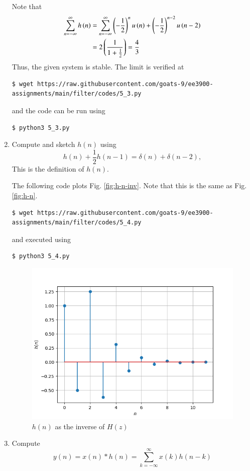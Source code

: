 \documentclass[journal,12pt,twocolumn]{IEEEtran}
\renewcommand\thesection{\arabic{section}}
\begin{document}
\begin{enumerate}[label=\thesection.\arabic*]
\solution
Note that
\begin{align}
	\sum_{n = -\infty}^{\infty}h\left(n\right) &= \sum_{n = -\infty}^{\infty}
	\left(-\frac{1}{2}\right)^nu\left(n\right) + \left(-\frac{1}{2}\right)^{n - 2}u\left(n - 2\right) \\
										 &= 2\left(\frac{1}{1 + \frac{1}{2}}\right) = \frac{4}{3}
\end{align}
Thus, the given system is stable. The limit is verified at
\begin{lstlisting}
$ wget https://raw.githubusercontent.com/goats-9/ee3900-assignments/main/filter/codes/5_3.py
\end{lstlisting}
and the code can be run using
\begin{lstlisting}
$ python3 5_3.py
\end{lstlisting}

\item 
Compute and sketch $h(n)$ using 
\begin{equation}
\label{eq:iir_filter_h}
h(n) + \frac{1}{2}h(n-1) = \delta(n) + \delta(n-2), 
\end{equation}
This is the definition of $h(n)$.

\solution The following code plots Fig. \eqref{fig:h-n-inv}. Note that this is
the same as Fig. \eqref{fig:h-n}.
\begin{lstlisting}
$ wget https://raw.githubusercontent.com/goats-9/ee3900-assignments/main/filter/codes/5_4.py
\end{lstlisting}
and executed using
\begin{lstlisting}
$ python3 5_4.py
\end{lstlisting}

\begin{figure}[!ht]
	\centering
	\includegraphics[width=\columnwidth]{figs/5_4.png}
	\caption{$h(n)$ as the inverse of $H(z)$}
	\label{fig:h-n-inv}
\end{figure}
\item Compute 
\begin{equation}
\label{eq:convolution}
y(n) = x(n)*h(n) = \sum_{k=-\infty}^{\infty}x(k)h(n-k)
\end{equation}


\end{enumerate}
\end{document}
